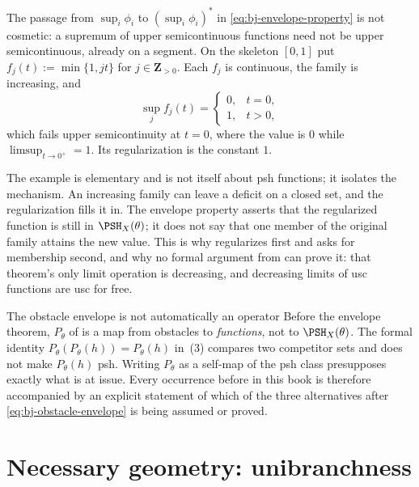 \begin{example}
\label{ex:ch36-sup-not-usc}
The passage from $\sup_i\phi_i$ to $(\sup_i\phi_i)^*$ in
\eqref{eq:bj-envelope-property} is not cosmetic: a supremum of upper
semicontinuous functions need not be upper semicontinuous, already on a
segment.  On the skeleton $[0,1]$ put $f_j(t):=\min\{1,jt\}$ for
$j\in\mathbf Z_{>0}$.  Each $f_j$ is continuous, the family is
increasing, and
\[
 \sup_j f_j(t)=\begin{cases}0,&t=0,\\ 1,&t>0,\end{cases}
\]
which fails upper semicontinuity at $t=0$, where the value is $0$ while
$\limsup_{t\to0^+}=1$.  Its regularization is the constant $1$.

The example is elementary and is not itself about psh functions; it isolates
the mechanism.  An increasing family can leave a deficit on a closed set,
and the regularization fills it in.  The envelope property asserts that the
regularized function is still in $\PSH_X(\theta)$; it does not say that one
member of the original family attains the new value.  This is why
 regularizes first and asks for membership
second, and why no formal argument from
 can prove it: that theorem's only limit
operation is decreasing, and decreasing limits of usc functions are usc for
free.
\end{example}

\begin{warning}{The obstacle envelope is not automatically an operator}
Before the envelope theorem, $P_\theta$ of
 is a map from obstacles to
\emph{functions}, not to $\PSH_X(\theta)$.  The formal identity
$P_\theta(P_\theta(h))=P_\theta(h)$ in
\,(3) compares two competitor sets and
does not make $P_\theta(h)$ psh.  Writing $P_\theta$ as a self-map of the
psh class presupposes exactly what is at issue.  Every occurrence before
 in this book is therefore accompanied by
an explicit statement of which of the three alternatives after
\eqref{eq:bj-obstacle-envelope} is being assumed or proved.
\end{warning}

\section{Necessary geometry: unibranchness}

